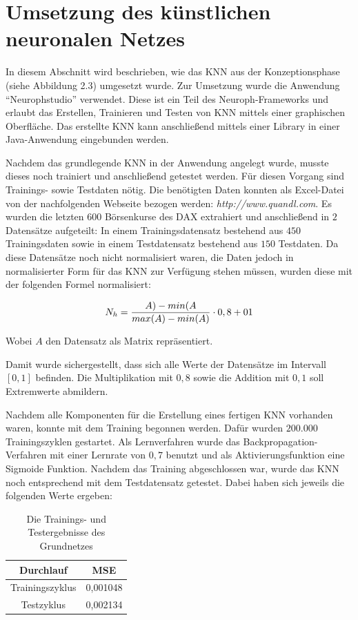\section{Umsetzung des künstlichen neuronalen Netzes} 
\label{section:Umsetzung des künstlichen neuronalen Netzes}

In diesem Abschnitt wird beschrieben, wie das KNN aus der Konzeptionsphase (siehe Abbildung 2.3) umgesetzt wurde. Zur Umsetzung wurde die Anwendung "`Neurophstudio"' verwendet. Diese ist ein Teil des Neuroph-Frameworks und erlaubt das Erstellen, Trainieren und Testen von KNN mittels einer graphischen Oberfläche. Das erstellte KNN kann anschließend mittels einer Library in einer Java-Anwendung eingebunden werden.

Nachdem das grundlegende KNN in der Anwendung angelegt wurde, musste dieses noch trainiert und anschließend getestet werden. Für diesen Vorgang sind Trainings- sowie Testdaten nötig. Die benötigten Daten konnten als Excel-Datei von der nachfolgenden Webseite bezogen werden: \textit{http://www.quandl.com}. Es wurden die letzten $600$ Börsenkurse des DAX extrahiert und anschließend in $2$ Datensätze aufgeteilt: In einem Trainingsdatensatz bestehend aus $450$ Trainingsdaten sowie in einem Testdatensatz bestehend aus $150$ Testdaten. Da diese Datensätze noch nicht normalisiert waren, die Daten jedoch in normalisierter Form für das KNN zur Verfügung stehen müssen, wurden diese mit der folgenden Formel normalisiert:

\begin{equation}\formelentry{Normalisierungsformel}
  N_h = \frac{A)-min(A}{max(A)-min(A)}\cdot0,8+01
\end{equation}

Wobei $A$ den Datensatz als Matrix repräsentiert.

Damit wurde sichergestellt, dass sich alle Werte der Datensätze im Intervall $[0,1]$ befinden. Die Multiplikation mit $0,8$ sowie die Addition mit $0,1$ soll Extremwerte abmildern.

Nachdem alle Komponenten für die Erstellung eines fertigen KNN vorhanden waren, konnte mit dem Training begonnen werden. Dafür wurden $200.000$ Trainingszyklen gestartet. Als Lernverfahren wurde das Backpropagation-Verfahren mit einer Lernrate von $0,7$ benutzt und als Aktivierungsfunktion eine Sigmoide Funktion. Nachdem das Training abgeschlossen war, wurde das KNN noch entsprechend mit dem Testdatensatz getestet. Dabei haben sich jeweils die folgenden Werte ergeben:

\begin{table}[H]
\centering
\begin{tabular}{|c|c|}
\hline 
\textbf{Durchlauf} & \textbf{MSE} \\ 
\hline 
Trainingszyklus & 0,001048 \\ 
\hline  
Testzyklus & 0,002134  \\ 
\hline 
\end{tabular} 
\label{tab:ERGGrundnetz}
\caption{Die Trainings- und Testergebnisse des Grundnetzes}
\end{table}

